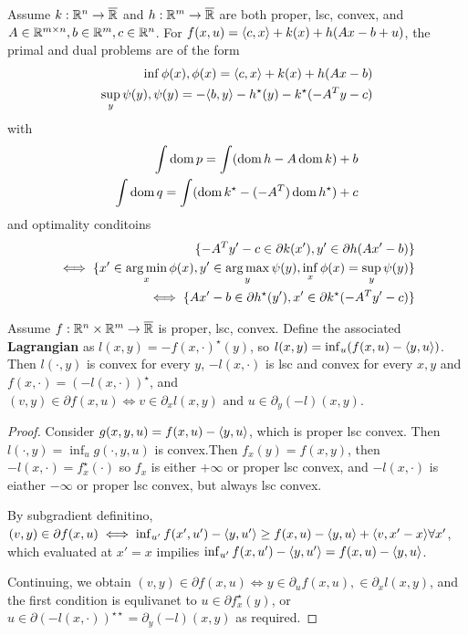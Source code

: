 \begin{thm}
  \label{sec:duality-optimization-7}
  Assume $k: \mathbb{R}^{n} \rightarrow \overline {\mathbb{R}}$ and $h: \mathbb{R}^{m}
  \rightarrow \overline {\mathbb{R}}$ are both proper, lsc, convex, and $A \in
  \mathbb{R}^{m \times n}, b \in \mathbb{R}^{m}, c \in \mathbb{R}^{n}$. For $f(x, u) = \IP{c,
    x} + k(x) + h(Ax - b + u)$, the primal and dual problems are of
  the form
\begin{align}
  \label{eq:43}
  \inf \phi(x), \phi(x) = \IP{c, x} + k(x) + h(Ax - b) \\
  \label{eq:44}
  \sup_{y} \psi(y), \psi(y) = -\IP{b, y} - h^{\star}(y) -
  k^{\star}(-A^{T}y - c)
\end{align} with
\begin{align}
  \label{eq:45}
  \int \operatorname*{dom} p = \int (\operatorname*{dom} h - A \operatorname*{dom} k) + b \\
  \label{eq:46}
  \int \operatorname*{dom} q = \int(\operatorname*{dom} k^{\star} - (-A^{T}) \operatorname*{dom} h^{\star}) + c
\end{align}
and optimality conditoins
\begin{align}
  \label{eq:47}
  \{ -A^{T} y' - c \in \partial k(x'), y' \in \partial h(Ax' - b) \}
  \\
  \iff \{ x' \in \operatorname*{arg\,min}_{x} \phi(x), y' \in \operatorname*{arg\,max}_{y} \psi(y),
  \inf_{x} \phi(x) = \sup_{y} \psi(y) \} \\ \iff \{ Ax' - b \in \partial
  h^{\star}(y'), x' \in \partial k^{\star}(-A^{T} y' - c) \}
\end{align}
\end{thm}

\begin{thm}
  \label{sec:duality-optimization-8}
  Assume $f: \mathbb{R}^{n} \times \mathbb{R}^{m} \rightarrow \overline {\mathbb{R}}$ is proper,
  lsc, convex.  Define the associated \textbf{Lagrangian} as $l(x, y)
  = -f(x, \cdot)^{\star}(y)$, so $l(x, y) = \inf_{u}(f(x, u) - \IP{y,
    u})$.  Then $l(\cdot, y)$ is convex for every $y$, $-l(x, \cdot)$
  is lsc and convex for every $x, y$ and $f(x, \cdot) = (-l(x,
  \cdot))^{\star}$, and $(v, y) \in \partial f(x, u) \iff v
  \in \partial_{x} l(x, y) \text{ and } u \in \partial_{y}(-l)(x, y)$.
\end{thm}

\begin{proof}
  Consider $g(x, y, u) = f(x, u) - \IP{y, u}$, which is proper lsc
  convex. Then $l(\cdot, y) = \inf_{u} g(\cdot, y, u)$ is convex.Then
  $f_{x}(y) = f(x, y)$, then $-l(x, \cdot) = f^{\star}_{x}(\cdot)$ so
  $f_{x}$ is either $+\infty$ or proper lsc convex, and $-l(x, \cdot)$
  is eiather $-\infty$ or proper lsc convex, but always lsc convex.

  By subgradient definitino, $(v, y) \in \partial f(x, u) \iff
  \inf_{u'} f(x', u') - \IP{y, u'} \geq f(x, u) - \IP{y, u} + \IP{v,
    x' - x} \forall x'$, which evaluated at $x' = x$ impilies
  $\inf_{u'} f(x, u') - \IP{y, u'} = f(x, u) - \IP{y, u}$.

  Continuing, we obtain $(v, y) \in \partial f(x, u) \iff y
  \in \partial_{u} f(x, u),  \in \partial_{x} l(x, y)$, and the first
  condition is equlivanet to $u \in \partial f^{\star}_{x}(y)$, or $u
  \in \partial (- l(x, \cdot))^{\star \star} = \partial_{y}(-l)(x, y)$
  as required.
\end{proof}

